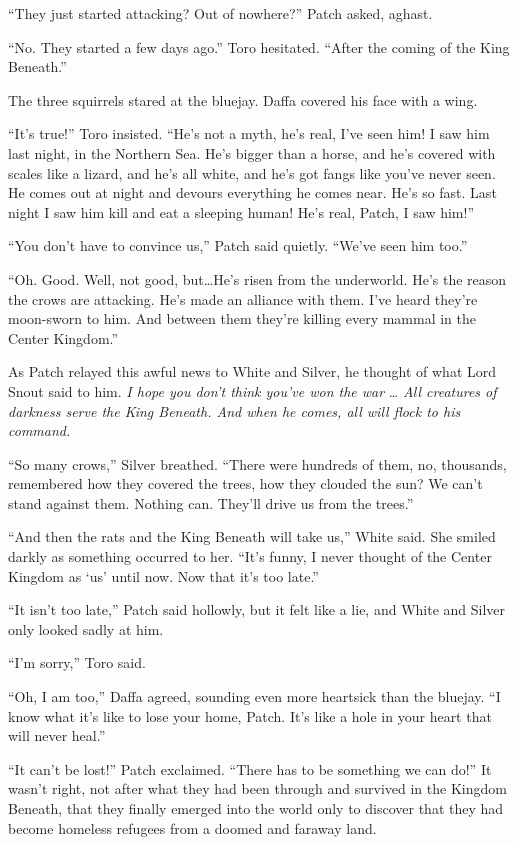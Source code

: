 \documentclass[ebook,oneside,openany,17pt]{memoir}
\newenvironment{tolerant}[1]{%
  \par\tolerance=#1\relax
}{%
  \par
}
\begin{document}
“They just started attacking? Out of nowhere?” Patch asked, aghast.

“No. They started a few days ago.” Toro hesitated. “After the coming
of the King Beneath.”

The three squirrels stared at the bluejay. Daffa covered his face with
a wing.

“It’s true!” Toro insisted. “He’s not a myth, he’s real, I’ve seen
him! I saw him last night, in the Northern Sea. He’s bigger than a
horse, and he’s covered with scales like a lizard, and he’s all white,
and he’s got fangs like you’ve never seen. He comes out at night and
devours everything he comes near. He’s so fast. Last night I saw him
kill and eat a sleeping human! He’s real, Patch, I saw him!”

“You don’t have to convince us,” Patch said quietly. “We’ve seen him
too.”

\begin{tolerant}{5000}
“Oh. Good. Well, not good, but…He’s risen from the underworld. He’s
the reason the crows are attacking. He’s made an alliance with
them. I’ve heard they’re moon-sworn to him. And between them they’re
killing every mammal in the Center Kingdom.”
\end{tolerant}

As Patch relayed this awful news to White and Silver, he thought of
what Lord Snout said to him. \emph{I hope you don’t think you’ve won
the war} … \emph{All creatures of darkness serve the King
Beneath. And when he comes, all will flock to his command.}

“So many crows,” Silver breathed. “There were hundreds of them, no,
thousands, remembered how they covered the trees, how they clouded the
sun? We can’t stand against them. Nothing can. They’ll drive us from
the trees.”

“And then the rats and the King Beneath will take us,” White said. She
smiled darkly as something occurred to her. “It’s funny, I never
thought of the Center Kingdom as ‘us’ until now. Now that it’s too
late.”

“It isn’t too late,” Patch said hollowly, but it felt like a lie, and
White and Silver only looked sadly at him.

“I’m sorry,” Toro said.

“Oh, I am too,” Daffa agreed, sounding even more heartsick than the
bluejay. “I know what it’s like to lose your home, Patch. It’s like a
hole in your heart that will never heal.”

“It can’t be lost!” Patch exclaimed. “There has to be something we can
do!” It wasn’t right, not after what they had been through and
survived in the Kingdom Beneath, that they finally emerged into the
world only to discover that they had become homeless refugees from a
doomed and faraway land.
\end{document}
